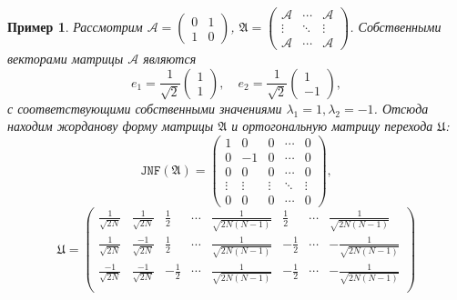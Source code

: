 \documentclass[a4paper]{article}
\newtheorem{example}{Пример}
\begin{document}
 \begin{example}
     Рассмотрим \( \mathcal{A} = \begin{pmatrix} 0 & 1 \\ 1 & 0 \end{pmatrix} \),
         \( \mathfrak{A} =
                    \begin{pmatrix}
                        \mathcal{A} & \cdots & \mathcal{A} \\
                        \vdots      & \ddots & \vdots \\
                        \mathcal{A} & \cdots & \mathcal{A}
                    \end{pmatrix} \).
     Собственными векторами матрицы \( \mathcal{A} \) являются
     \[
         e_1 = \frac{1}{\sqrt2}\begin{pmatrix} 1 \\ 1 \end{pmatrix},\quad e_2 = \frac{1}{\sqrt2}\begin{pmatrix} 1 \\ -1 \end{pmatrix},
             \]
         с соответствующими собственными значениями \( \lambda_1=1, \lambda_2=-1 \).
     Отсюда находим жорданову форму матрицы \( \mathfrak{A} \) и ортогональную матрицу перехода \( \mathfrak{U} \):
     \[
         \mathtt{JNF}(\mathfrak{A}) =
         \begin{pmatrix}
             1 & 0  & 0 & \cdots & 0 \\
             0 & -1 & 0 & \cdots & 0 \\
             0 & 0  & 0 & \cdots & 0 \\
             \vdots & \vdots & \vdots & \ddots & \vdots \\
             0 & 0 & 0 & \cdots & 0
         \end{pmatrix}, \]
     \[
         \mathfrak{U} = 
         \begin{pmatrix}
             \frac{1}{\sqrt{2N}}  & \frac{1}{\sqrt{2N}}  & \frac12  & \cdots & \frac{1}{\sqrt{2N(N-1)}}   & \frac12  & \cdots & \frac{1}{\sqrt{2N(N-1)}} \\
             \frac{1}{\sqrt{2N}}  & \frac{-1}{\sqrt{2N}} & \frac12  & \cdots & \frac{1}{\sqrt{2N(N-1)}}   & -\frac12 & \cdots & -\frac{1}{\sqrt{2N(N-1)}} \\
             \frac{-1}{\sqrt{2N}} & \frac{-1}{\sqrt{2N}} & -\frac12 & \cdots & \frac{1}{\sqrt{2N(N-1)}}   & -\frac12 & \cdots & -\frac{1}{\sqrt{2N(N-1)}} \\

\end{pmatrix}\]
\end{example}
\end{document}
